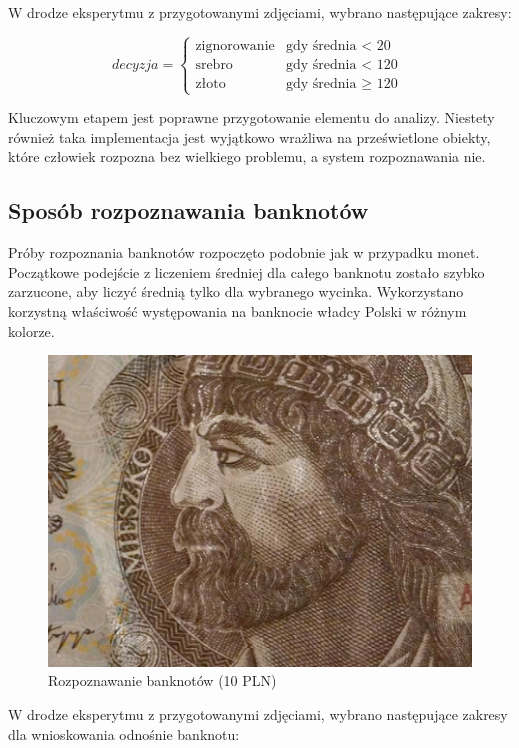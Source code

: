 \documentclass{mwart}
\begin{document}
W drodze eksperytmu z przygotowanymi zdjęciami, wybrano następujące zakresy:

$$
decyzja = \left\{\begin{array}{ll}
\textrm{zignorowanie} & \textrm{gdy średnia $<$ 20}\\
\textrm{srebro} & \textrm{gdy średnia $<$ 120}\\
\textrm{złoto} & \textrm{gdy średnia $\geq$ 120 }
\end{array} \right.
$$

Kluczowym etapem jest poprawne przygotowanie elementu do analizy. Niestety również taka implementacja jest wyjątkowo wrażliwa na prześwietlone obiekty, które człowiek rozpozna bez wielkiego problemu, a system rozpoznawania nie.

\subsection{Sposób rozpoznawania banknotów}

Próby rozpoznania banknotów rozpoczęto podobnie jak w przypadku monet. Początkowe podejście z liczeniem średniej dla całego banknotu zostało szybko zarzucone, aby liczyć średnią tylko dla wybranego wycinka. Wykorzystano korzystną właściwość występowania na banknocie władcy Polski w różnym kolorze.

\begin{figure}[H]
    \centering
    \includegraphics[width=\textwidth]{10_PLN_part.png}
    \caption{Rozpoznawanie banknotów (10 PLN)}
\end{figure}

W drodze eksperytmu z przygotowanymi zdjęciami, wybrano następujące zakresy dla wnioskowania odnośnie banknotu:
\end{document}
